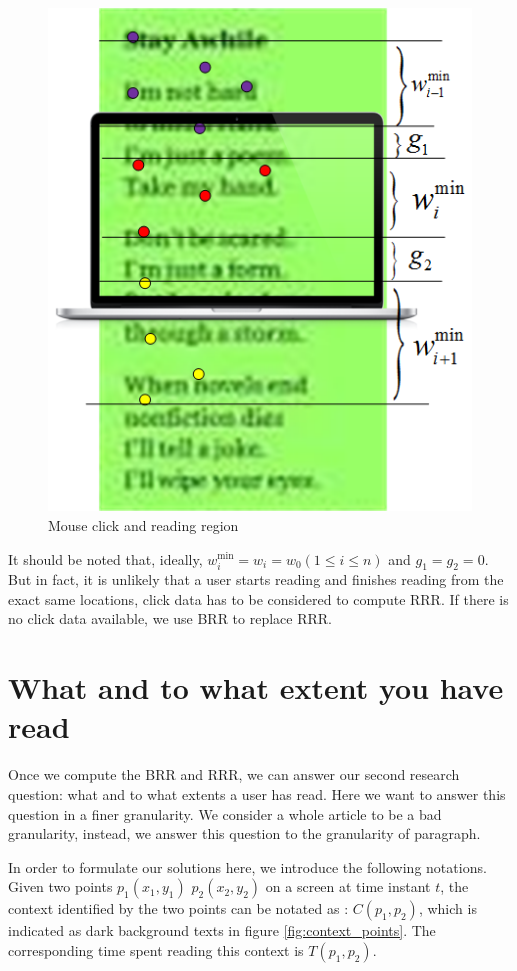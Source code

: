 \documentclass{sigchi}
\begin{document}
 
\begin{figure}[!h]
\centering
\includegraphics[width=0.9\columnwidth]{pictures/neighbor-scroll}
\caption{Mouse click and reading region}
\label{fig:neighbor_scroll}
\end{figure}


It should be noted that, ideally, $w_i^{\min } = {w_i} = {w_0}(1 \le i \le n)$ and 
$g_1=g_2=0$. But in fact, it is unlikely that a user starts reading and
finishes reading from the exact same locations, click data has to be considered
to compute RRR. If there is no click data available, we use BRR to replace RRR.

\section{ What and to what extent you have read}
Once we compute the BRR and RRR, we can answer our second research question: what and to what extents a user has read.
Here we want to answer this question in a finer granularity. We consider a whole article to be a bad granularity, instead, we 
answer this question to the granularity of paragraph.

 In order to formulate our solutions here, we introduce the following 
notations. Given two points $p_1(x_1,y_1)$ $p_2(x_2,y_2)$  on a screen at time instant $t$, the context identified by the two points can be 
notated as : $C(p_1,p_2)$, which is indicated as dark background texts in figure \ref{fig:context_points}. The corresponding time spent reading  
this context is $T(p_1,p_2)$.  
\end{document}
